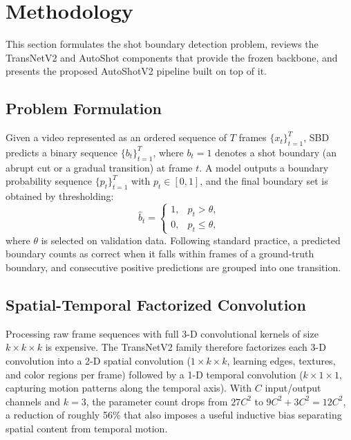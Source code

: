 \section{Methodology}
\label{sec:method}

This section formulates the shot boundary detection problem, reviews the
TransNetV2 and AutoShot components that provide the frozen backbone, and
presents the proposed AutoShotV2 pipeline built on top of it.

\subsection{Problem Formulation}
\label{sec:problem}

Given a video represented as an ordered sequence of $T$ frames
$\{x_t\}_{t=1}^{T}$, SBD predicts a binary sequence $\{b_t\}_{t=1}^{T}$,
where $b_t{=}1$ denotes a shot boundary (an abrupt cut or a gradual
transition) at frame $t$. A model outputs a boundary probability sequence
$\{p_t\}_{t=1}^{T}$ with $p_t\in[0,1]$, and the final boundary set is
obtained by thresholding:
\begin{equation}
    \hat b_t=\begin{cases}1, & p_t > \theta,\\ 0, & p_t \le \theta,\end{cases}
    \label{eq:threshold}
\end{equation}
where $\theta$ is selected on validation data. Following standard practice,
a predicted boundary counts as correct when it falls within
\PaperMatchTolerance{} frames of a ground-truth boundary, and consecutive
positive predictions are grouped into one transition.

\subsection{Spatial-Temporal Factorized Convolution}

Processing raw frame sequences with full 3-D convolutional kernels of size
$k\times k\times k$ is expensive. The TransNetV2 family therefore factorizes
each 3-D convolution into a 2-D spatial convolution ($1\times k\times k$,
learning edges, textures, and color regions per frame) followed by a 1-D
temporal convolution ($k\times 1\times 1$, capturing motion patterns along
the temporal axis). With $C$ input/output channels and $k{=}3$, the
parameter count drops from $27C^2$ to $9C^2+3C^2=12C^2$, a reduction of
roughly 56\% that also imposes a useful inductive bias separating spatial
content from temporal motion.

